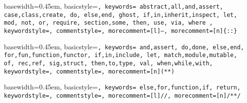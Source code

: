{ basewidth=0.45em,
  basicstyle=\small\tt,
  keywords={
    abstract,all,and,assert,
    case,class,create,
    do,
    else,end,
    ghost,
    if,in,inherit,inspect,
    let,
    mod,
    not,
    or,
    require,
    section,some,
    then,
    use,
    via,
    where
  },
  keywordstyle=\color{blue},
  commentstyle=\color{brown},
  morecomment=[l]{--},
  morecomment=[n]{\{:}{:\}}
}

 {\lstset{language=alba}} {}







{ basewidth=0.45em,
  basicstyle=\tt\small,
  keywords={
    and,assert,
    do,done,
    else,end,
    for,fun,function,functor,
    if,in,include,
    let,
    match,module,mutable,
    of,
    rec,ref,
    sig,struct,
    then,to,type,
    val,
    when,while,with},
  keywordstyle=\color{blue},
  commentstyle=\color{brown},
  morecomment=[n]{(*}{*)}
}

 {\lstset{language=ocaml}} {}





{ basewidth=0.45em,
  basicstyle=\small\tt,
  keywords={
    else,for,function,if,
    return},
  keywordstyle=\color{blue},
  commentstyle=\color{brown},
  morecomment=[l]{//},
  morecomment=[n]{/*}{*/}
}

 {\lstset{language=js}} {}




\newcommand{\code}[1]{{\tt\small #1}}
\def\Abold{\mathbf{A}}
\def\abold{\mathbf{a}}
\def\Bbold{\mathbf{B}}
\def\bbold{\mathbf{b}}
\def\Cbold{\mathbf{C}}
\def\Dbold{\mathbf{D}}
\def\fbold{\mathbf{f}}
\def\Pbold{\mathbf{P}}
\def\pbold{\mathbf{p}}
\def\qbold{\mathbf{q}}
\def\Tbold{\mathbf{T}}
\def\tbold{\mathbf{t}}
\def\xbold{\mathbf{x}}
\def\ybold{\mathbf{y}}
\def\zbold{\mathbf{z}}


\def\Abstract{{\cal{A}}}
\def\Any{{\cal{U}}}
\def\Boolean  {{\mathbb{B}}}
\def\Decision {{\mathbb{D}}}
\def\List   {{\mathbb{L}}}
\def\Natural{{\mathbb{N}}}
\def\Prop{{\cal{P}}}

\def\case  {\text{case}}
\def\fix   {\text{fix}}
\def\ind   {\text{ind}}
\def\Inductive    {\mathbb{I}}
\def\Constructor  {\mathbb{C}}

\def\imp{\Rightarrow}
\def\reduce{\mathrel{\triangleright}}
\def\reducekey{\reduce_\text{key}}
\def\bind{{>\!\!\!>\!\!=}}
\def\caret{\mathrel{\hat{\ }}}
\def\carettext{\^\ }


